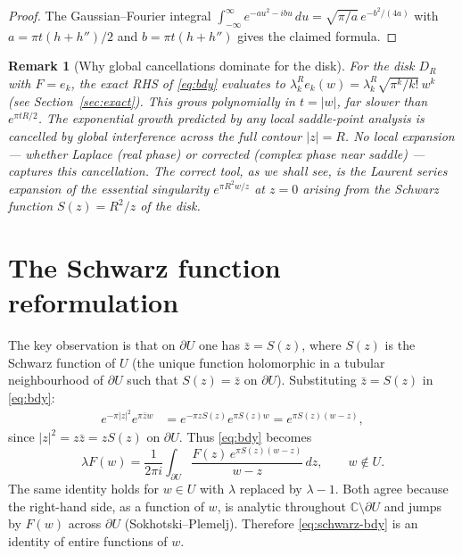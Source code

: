 \documentclass[a4paper,11pt,reqno]{amsart}
\newtheorem{remark}{Remark}[section]
\begin{document}
\begin{proof}
The Gaussian--Fourier integral $\int_{-\infty}^\infty e^{-au^2-ibu}\,du=\sqrt{\pi/a}\,e^{-b^2/(4a)}$
with $a=\pi t(h+h'')/2$ and $b=\pi t(h+h'')$ gives the claimed formula.
\end{proof}

\begin{remark}[Why global cancellations dominate for the disk]
\label{rem:global}
For the disk $D_R$ with $F=e_k$, the exact RHS of \eqref{eq:bdy} evaluates to
$\lambda_k^R e_k(w)=\lambda_k^R\sqrt{\pi^k/k!}\,w^k$ (see Section~\ref{sec:exact}).
This grows polynomially in $t=|w|$, far slower than $e^{\pi tR/2}$. The
exponential growth predicted by any local saddle-point analysis is cancelled by
global interference across the full contour $|z|=R$. No local expansion --- whether
Laplace (real phase) or corrected (complex phase near saddle) --- captures this
cancellation. The correct tool, as we shall see, is the Laurent series expansion
of the essential singularity $e^{\pi R^2 w/z}$ at $z=0$ arising from the Schwarz
function $S(z)=R^2/z$ of the disk.
\end{remark}

\section{The Schwarz function reformulation}
\label{sec:schwarz}

The key observation is that on $\partial U$ one has $\bar{z}=S(z)$, where
$S(z)$ is the Schwarz function of $U$ (the unique function holomorphic in a
tubular neighbourhood of $\partial U$ such that $S(z)=\bar{z}$ on $\partial U$).
Substituting $\bar{z}=S(z)$ in \eqref{eq:bdy}:
\begin{align}
e^{-\pi|z|^2}e^{\pi\bar{z}w}&=e^{-\pi zS(z)}e^{\pi S(z)w}=e^{\pi S(z)(w-z)},
\label{eq:schwarz-exponent}
\end{align}
since $|z|^2=z\bar{z}=zS(z)$ on $\partial U$. Thus \eqref{eq:bdy} becomes
\begin{equation}\label{eq:schwarz-bdy}
\lambda F(w)=\frac{1}{2\pi i}\int_{\partial U}
\frac{F(z)\,e^{\pi S(z)(w-z)}}{w-z}\,dz,\qquad w\notin U.
\end{equation}
The same identity holds for $w\in U$ with $\lambda$ replaced by $\lambda-1$.
Both agree because the right-hand side, as a function of $w$, is analytic
throughout $\mathbb{C}\setminus\partial U$ and jumps by $F(w)$ across $\partial U$
(Sokhotski--Plemelj). Therefore \eqref{eq:schwarz-bdy} is an identity of entire
functions of $w$.
\end{document}
